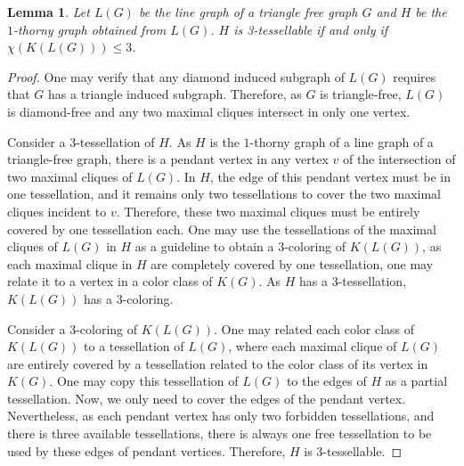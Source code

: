 \documentclass[9pt]{entcs} \usepackage{entcsmacro}
\newtheorem{lema}{Lemma}[section]
\begin{document}
\begin{lema}
Let $L(G)$ be the line graph of a triangle free graph $G$ and $H$ be the $1$-thorny graph obtained from $L(G)$.
$H$ is 3-tessellable if and only if $\chi(K(L(G))) \leq 3$.
\label{lema:carthorny}
\end{lema}
\begin{proof}
One may verify that any diamond induced subgraph of $L(G)$ requires that $G$ has a triangle induced subgraph.
Therefore, as $G$ is triangle-free, $L(G)$ is diamond-free
and any two maximal cliques intersect in only one vertex.

Consider a $3$-tessellation of $H$.
As $H$ is the $1$-thorny graph of a line graph of a triangle-free graph, there is a pendant vertex in any vertex $v$ of the intersection of two maximal cliques of $L(G)$.
In $H$,  the edge of this pendant vertex must be in one tessellation, and it remains only two tessellations to cover the two maximal cliques incident to $v$.
Therefore, these two maximal cliques must be entirely covered by one tessellation each.
One may use the tessellations of the maximal cliques of $L(G)$ in $H$ as a guideline to obtain a $3$-coloring of $K(L(G))$, as each maximal clique in $H$ are completely covered by one tessellation, one may relate it to a vertex in a color class of $K(G)$. 
As $H$ has a $3$-tessellation, $K(L(G))$ has a $3$-coloring.

Consider a $3$-coloring of $K(L(G))$.
One may related each color class of $K(L(G))$ to a tessellation of $L(G)$, where each maximal clique of $L(G)$ are entirely covered by a tessellation related to the color class of its vertex in $K(G)$.
One may copy this tessellation of $L(G)$ to the edges of $H$ as a partial tessellation.
Now, we only need to cover the edges of the pendant vertex.
Nevertheless, as each pendant vertex has only two forbidden tessellations, and there is three available tessellations, there is always one free tessellation to be used by these edges of pendant vertices.
Therefore, $H$ is $3$-tessellable.
\end{proof}


\end{document}
